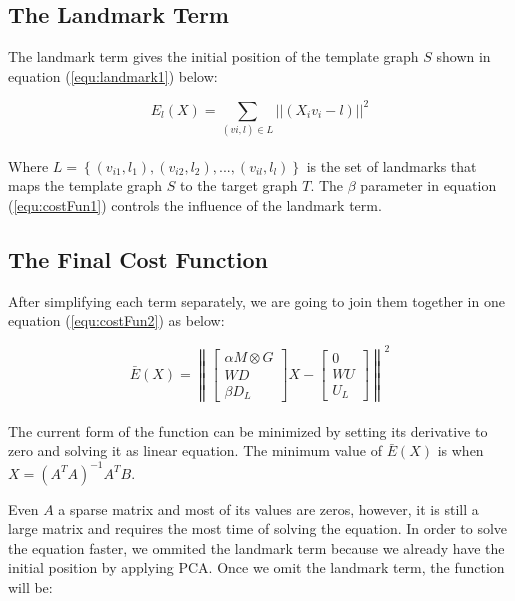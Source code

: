 \documentclass[../structure.tex]{subfiles}
\begin{document}
\subsection{The Landmark Term}
\hspace{2em}The landmark term gives the initial position of the template graph $S$ shown in equation (\ref{equ:landmark1}) below:

\begin{equation}
E_{l}(X) = \sum_{(vi,l) \in L}||(X_{i}v_{i} - l)||^2
\label{equ:landmark1}
\end{equation}\\

Where $L = \left\{(v_{i1},l_{1}),(v_{i2},l_{2}),...,(v_{il},l_{l})\right\}$ is the set of landmarks that maps the template graph $S$ to the target graph $T$. The $\beta$ parameter in equation (\ref{equ:costFun1}) controls the influence of the landmark term.

\subsection{The Final Cost Function}
After simplifying each term separately, we are going to join them together in one equation (\ref{equ:costFun2}) as below:

\begin{equation}
\bar{E}(X) = \left\|
\begin{bmatrix}
\alpha M \otimes G \\ WD \\ \beta D_{L}
\end{bmatrix}
X -
\begin{bmatrix}
0 \\ WU \\ U_{L}
\end{bmatrix}
\right\| ^2 
\label{equ:costFun2}
\end{equation}\\

The current form of the function can be minimized by setting its derivative to zero and solving it as linear equation. The minimum value of $\bar{E}(X)$ is when $X = (A^T A)^{-1} A^T B$.

Even $A$ a sparse matrix and most of its values are zeros, however, it is still a large matrix and requires the most time of solving the equation. In order to solve the equation faster, we ommited the landmark term because we already have the initial position by applying PCA. Once we omit the landmark term, the function will be:
\end{document}
